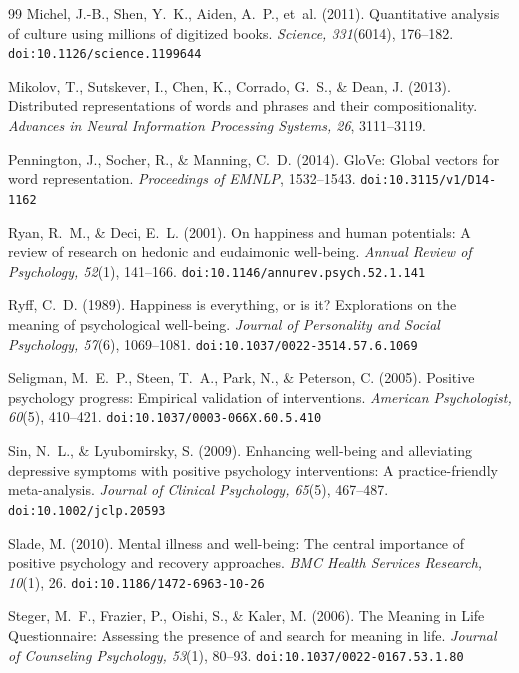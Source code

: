 \documentclass[12pt,a4paper]{article}
\begin{document}
\begin{thebibliography}{99}
Michel, J.-B., Shen, Y.~K., Aiden, A.~P., et~al. (2011).
Quantitative analysis of culture using millions of digitized books.
\textit{Science, 331}(6014), 176--182.
\texttt{doi:10.1126/science.1199644}

Mikolov, T., Sutskever, I., Chen, K., Corrado, G.~S., \& Dean, J. (2013).
Distributed representations of words and phrases and their compositionality.
\textit{Advances in Neural Information Processing Systems, 26}, 3111--3119.

Pennington, J., Socher, R., \& Manning, C.~D. (2014).
GloVe: Global vectors for word representation.
\textit{Proceedings of EMNLP}, 1532--1543.
\texttt{doi:10.3115/v1/D14-1162}

Ryan, R.~M., \& Deci, E.~L. (2001).
On happiness and human potentials: A review of research on hedonic and eudaimonic well-being.
\textit{Annual Review of Psychology, 52}(1), 141--166.
\texttt{doi:10.1146/annurev.psych.52.1.141}

Ryff, C.~D. (1989).
Happiness is everything, or is it? Explorations on the meaning of psychological well-being.
\textit{Journal of Personality and Social Psychology, 57}(6), 1069--1081.
\texttt{doi:10.1037/0022-3514.57.6.1069}

Seligman, M.~E.~P., Steen, T.~A., Park, N., \& Peterson, C. (2005).
Positive psychology progress: Empirical validation of interventions.
\textit{American Psychologist, 60}(5), 410--421.
\texttt{doi:10.1037/0003-066X.60.5.410}

Sin, N.~L., \& Lyubomirsky, S. (2009).
Enhancing well-being and alleviating depressive symptoms with positive psychology interventions: A practice-friendly meta-analysis.
\textit{Journal of Clinical Psychology, 65}(5), 467--487.
\texttt{doi:10.1002/jclp.20593}

Slade, M. (2010).
Mental illness and well-being: The central importance of positive psychology and recovery approaches.
\textit{BMC Health Services Research, 10}(1), 26.
\texttt{doi:10.1186/1472-6963-10-26}

Steger, M.~F., Frazier, P., Oishi, S., \& Kaler, M. (2006).
The Meaning in Life Questionnaire: Assessing the presence of and search for meaning in life.
\textit{Journal of Counseling Psychology, 53}(1), 80--93.
\texttt{doi:10.1037/0022-0167.53.1.80}


\end{thebibliography}
\end{document}
